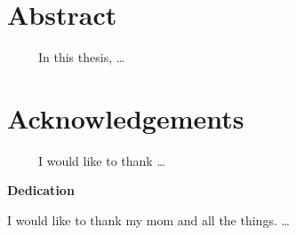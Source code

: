 \section*{\large{Abstract}}
\ \ \ \ \ In this thesis, \ldots
\pagebreak

\section*{\large{Acknowledgements}}
\ \ \ \ \ I would like to thank \ldots
\pagebreak

\vspace*{\fill} %
\begin{center} %

\begin{large}
\textbf{Dedication} \\
\end{large}
\indent I would like to thank my mom and all the things. \ldots

\end{center}
\vspace*{\fill}
\pagebreak

\tableofcontents
\pagebreak

\listoftables
\pagebreak

\listoffigures
\pagebreak